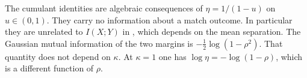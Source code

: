 The cumulant identities are algebraic consequences of $\eta = 1/(1-u)$ on $u\in(0,1)$.
They carry no information about a match outcome.
In particular they are unrelated to $I(X;Y)$ in \textcite{brownPEFempirical}, which depends on the mean separation.
The Gaussian mutual information of the two margins is $-\tfrac{1}{2}\log(1-\rho^{2})$.
That quantity does not depend on $\kappa$.
At $\kappa = 1$ one has $\log\eta = -\log(1-\rho)$, which is a different function of $\rho$.
